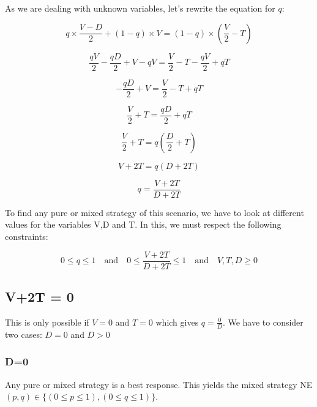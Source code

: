 \documentclass[a4paper, 11pt]{article}
\begin{document}
As we are dealing with unknown variables, let's rewrite the equation for $q$:

\[ q \times \frac{V-D}{2} + (1-q) \times V = (1-q) \times ( \frac{V}{2} - T) \]

\[ \frac{qV}{2} - \frac{qD}{2} + V - qV = \frac{V}{2} - T - \frac{qV}{2} + qT \]

\[ - \frac{qD}{2} + V = \frac{V}{2} - T + qT \]

\[ \frac{V}{2} + T = \frac{qD}{2} + qT \]

\[ \frac{V}{2} + T = q( \frac{D}{2} + T) \]

\[ V + 2T = q( D + 2T) \]

\[ q = \frac{V + 2T}{D + 2T} \]

To find any pure or mixed strategy of this scenario, we have to look at different values for the variables V,D and T. In this, we must respect the following constraints:

\[ 0\leq q\leq 1 \quad\mathrm{and}\quad 0 \leq \frac{V + 2T}{D + 2T} \leq 1 \quad\mathrm{and}\quad V,T,D \geq 0 \]

\subsection{V+2T = 0}

This is only possible if $V=0$ and $T=0$ which gives $q = \frac{0}{D}$. We have to consider two cases: $D=0$ and $D>0$

\subsubsection{D=0}

Any pure or mixed strategy is a best response. This yields the mixed strategy NE $(p,q) \in \{(0\leq p \leq 1),(0\leq q \leq 1)  \}$.
\end{document}

